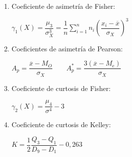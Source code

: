 \begin{enumerate}
	\item Coeficiente de asimetría de Fisher:
	\begin{center}
		$\gamma_1(X) = \dfrac{\mu_3}{\sigma_X^3} = \dfrac{1}{n} \sum_{i=1}^{n}n_i(\dfrac{x_i - \overline{x}}{\sigma_X})^3$
	\end{center}


	\item Coeficientes de asimetría de Pearson:
	
	\begin{center}
		$A_p = \dfrac{\overline{x}- M_O}{\sigma_X}\qquad A_p^* = \dfrac{3(\overline{x}- M_e)}{\sigma_X}$
	\end{center}

	\item Coeficiente de curtosis de Fisher:
	
	\begin{center}
		$\gamma_2(X) = \dfrac{\mu_4}{\sigma^4} - 3$
	\end{center}
	
	\item Coeficiente de curtosis de Kelley:
	
	\begin{center}
		$K = \dfrac{1}{2} \dfrac{Q_3 - Q_1}{D_9 - D_1}- 0,263$
	\end{center}
\end{enumerate}




